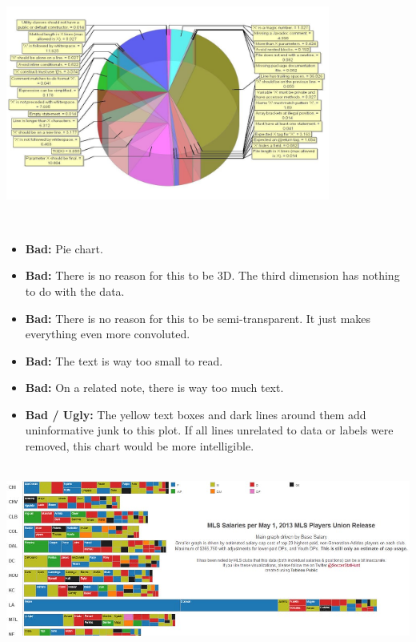 \documentclass[]{book}
\providecommand{\tightlist}{%
  \setlength{\itemsep}{0pt}\setlength{\parskip}{0pt}}
\begin{document}
~\\

\includegraphics[width=0.8\textwidth,height=\textheight]{img/vis6.jpg}

~

\begin{itemize}
\tightlist
\item
  \textbf{Bad:} Pie chart.
\item
  \textbf{Bad:} There is no reason for this to be 3D. The third dimension has nothing to do with the data.
\item
  \textbf{Bad:} There is no reason for this to be semi-transparent. It just makes everything even more convoluted.
\item
  \textbf{Bad:} The text is way too small to read.
\item
  \textbf{Bad:} On a related note, there is way too much text.\\
\item
  \textbf{Bad / Ugly:} The yellow text boxes and dark lines around them add uninformative junk to this plot. If all lines unrelated to data or labels were removed, this chart would be more intelligible.
\end{itemize}

~\\

\includegraphics{img/vis7.jpeg}

~
\end{document}
